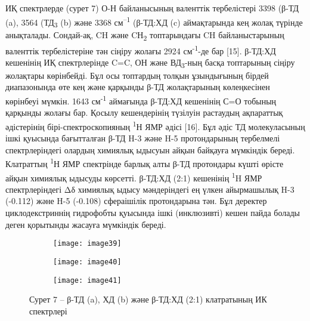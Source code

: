 \begin{multicols}{2}
ИҚ спектрлерде (сурет 7) О-Н байланысының валенттік тербелістері 3398
(β-ТД (a), 3564 (ТД\textsubscript{3} (b) және 3368
см\textsuperscript{--1} (β-ТД:ХД (c) аймақтарында кең жолақ түрінде
анықталады. Сондай-ақ, CH және CН\textsubscript{2} топтарындағы CH
байланыстарының валенттік тербелістеріне тән сіңіру жолағы 2924
см\textsuperscript{-1}-де бар {[}15{]}. β-ТД:ХД кешенінің ИҚ
спектрлерінде C=C, ОН және ВД\textsubscript{3}-ның басқа топтарының
сіңіру жолақтары көрінбейді. Бұл осы топтардың толқын ұзындығының бірдей
диапазонында өте кең және қарқынды β-ТД жолақтарының көлеңкесінен
көрінбеуі мүмкін. 1643 см\textsuperscript{-1} аймағында β-ТД:ХД
кешенінің С=О тобының қарқынды жолағы бар. Қосылу кешендерінің түзілуін
растаудың ақпараттық әдістерінің бірі-спектроскопияның
\textsuperscript{1}Н ЯМР әдісі {[}16{]}. Бұл әдіс ТД молекуласының ішкі
қуысында бағытталған β-ТД H-3 және H-5 протондарының тербелмелі
спектрлеріндегі олардың химиялық ыдысуын айқын байқауға мүмкіндік
береді. Клатраттың \textsuperscript{1}Н ЯМР спектрінде барлық алты β-ТД
протондары күшті өрісте айқын химиялық ыдысуды көрсетті. β-ТД:ХД (2:1)
кешенінің \textsuperscript{1}H ЯМР спектрлеріндегі Δδ химиялық ыдысу
мәндеріндегі ең үлкен айырмашылық H-3 (-0.112) және H-5 (-0.108)
сфераішілік протондарына тән. Бұл деректер циклодекстриннің гидрофобты
қуысында ішкі (инклюзивті) кешен пайда болады деген қорытынды жасауға
мүмкіндік береді.
\end{multicols}

\begin{figure}[H]
\centering
\begin{subfigure}[b]{0.45\textwidth}
\centering
\texttt{[image: image39]}
\end{subfigure}
\begin{subfigure}[b]{0.45\textwidth}
\centering
\texttt{[image: image40]}
\end{subfigure}
\begin{subfigure}[b]{0.45\textwidth}
\centering
\texttt{[image: image41]}
\end{subfigure}
\caption*{Сурет 7 -- β-ТД (a), ХД (b) және β-ТД:ХД (2:1) клатратының ИК спектрлері}
\end{figure}

